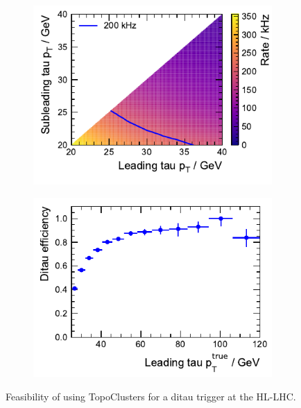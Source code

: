 \begin{figure}[htb]
  \centering
  \begin{subfigure}[t]{0.48\textwidth}
    \centering
    \includegraphics{./figures/rnn/trigger/pt_rate_reg.pdf}
    \label{fig:rate_vs_thresholds}
  \end{subfigure}\hfill
  \begin{subfigure}[t]{0.48\textwidth}
    \centering
    \includegraphics{./figures/rnn/trigger/taueff_reg.pdf}
    \label{fig:ditau_trigger_eff}
  \end{subfigure}
  \caption{Feasibility of using TopoClusters for a ditau trigger at the
    HL-LHC.}
  \label{fig:rnn_ditau_trigger}
\end{figure}

